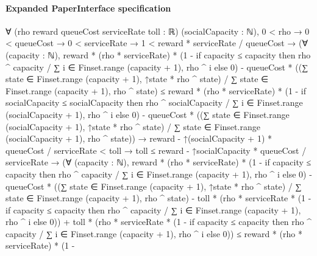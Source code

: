 \documentclass[10pt]{article}
\begin{document}
\paragraph{Expanded PaperInterface specification}
\begin{ReviewVerbatim}
∀ (rho reward queueCost serviceRate toll : ℝ) (socialCapacity : ℕ),
  0 < rho →
    0 < queueCost →
      0 < serviceRate →
        1 < reward * serviceRate / queueCost →
          (∀ (capacity : ℕ),
              reward * (rho * serviceRate) *
                    (1 -
                      if capacity ≤ capacity then rho ^ capacity / ∑ i ∈ Finset.range (capacity + 1), rho ^ i else 0) -
                  queueCost *
                    ((∑ state ∈ Finset.range (capacity + 1), ↑state * rho ^ state) /
                      ∑ state ∈ Finset.range (capacity + 1), rho ^ state) ≤
                reward * (rho * serviceRate) *
                    (1 -
                      if socialCapacity ≤ socialCapacity then
                        rho ^ socialCapacity / ∑ i ∈ Finset.range (socialCapacity + 1), rho ^ i
                      else 0) -
                  queueCost *
                    ((∑ state ∈ Finset.range (socialCapacity + 1), ↑state * rho ^ state) /
                      ∑ state ∈ Finset.range (socialCapacity + 1), rho ^ state)) →
            reward - ↑(socialCapacity + 1) * queueCost / serviceRate < toll →
              toll ≤ reward - ↑socialCapacity * queueCost / serviceRate →
                (∀ (capacity : ℕ),
                    reward * (rho * serviceRate) *
                              (1 -
                                if capacity ≤ capacity then rho ^ capacity / ∑ i ∈ Finset.range (capacity + 1), rho ^ i
                                else 0) -
                            queueCost *
                              ((∑ state ∈ Finset.range (capacity + 1), ↑state * rho ^ state) /
                                ∑ state ∈ Finset.range (capacity + 1), rho ^ state) -
                          toll *
                            (rho * serviceRate *
                              (1 -
                                if capacity ≤ capacity then rho ^ capacity / ∑ i ∈ Finset.range (capacity + 1), rho ^ i
                                else 0)) +
                        toll *
                          (rho * serviceRate *
                            (1 -
                              if capacity ≤ capacity then rho ^ capacity / ∑ i ∈ Finset.range (capacity + 1), rho ^ i
                              else 0)) ≤
                      reward * (rho * serviceRate) *
                              (1 -

\end{ReviewVerbatim}
\end{document}
